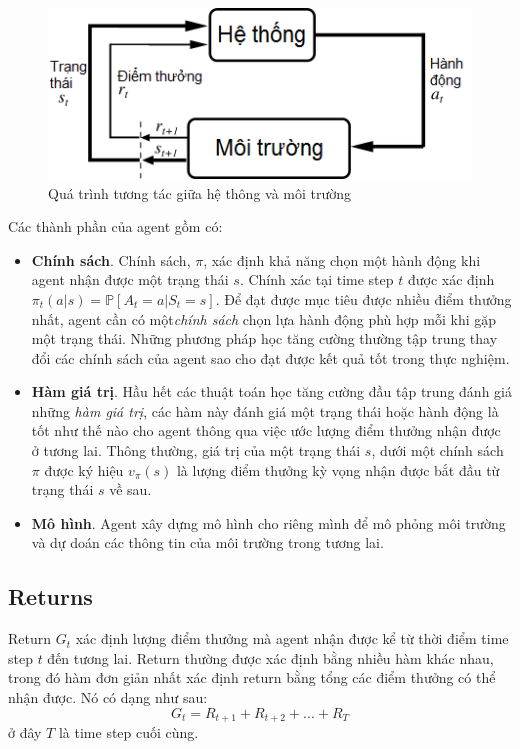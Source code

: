 	\begin{figure}
		\centering
		\includegraphics[width=\textwidth]{AgentEnvironment}
		\caption{Quá trình tương tác giữa hệ thông và môi trường}
		\label{AgentEnvironment}
	\end{figure}
	
	Các thành phần của agent gồm có:
	\begin{itemize}
		\item \textbf{Chính sách}. Chính sách, $\pi$, xác định khả năng chọn một hành động khi agent nhận được một trạng thái $s$. Chính xác tại time step $t$ được xác định $\pi_t(a|s) = \mathbb{P}[\mathit{A_t} = a|\mathit{S_t} = s]$. Để đạt được mục tiêu được nhiều điểm thưởng nhất, agent cần có một\textit{chính sách} chọn lựa hành động phù hợp mỗi khi gặp một trạng thái. Những phương pháp học tăng cường thường tập trung thay đổi các chính sách của agent sao cho đạt được kết quả tốt trong thực nghiệm.
		\item \textbf{Hàm giá trị}. Hầu hết các thuật toán học tăng cường đầu tập trung đánh giá những \textit{hàm giá trị}, các hàm này đánh giá một trạng thái hoặc hành động là tốt như thế nào cho agent thông qua việc ước lượng điểm thưởng nhận được ở tương lai. Thông thường, giá trị của một trạng thái $s$, dưới một chính sách $\pi$  được ký hiệu $v_{\pi}(s)$ là lượng điểm thưởng kỳ vọng nhận được bắt đầu từ trạng thái $s$ về sau.
		\item \textbf{Mô hình}. Agent xây dựng mô hình cho riêng mình để mô phỏng môi trường và dự doán các thông tin của môi trường trong tương lai.
	\end{itemize}	
	
	\subsection{Returns}
	Return $\mathit{G_t}$ xác định lượng điểm thưởng mà agent nhận được kể từ thời điểm time step $t$ đến tương lai. Return thường được xác định bằng nhiều hàm khác nhau, trong đó hàm đơn giản nhất xác định return bằng tổng các điểm thưởng có thể nhận được. Nó có dạng như sau:
	$$\mathit{G_t} = \mathit{R_{t+1}} + \mathit{R_{t+2}} + ... + \mathit{R_{T}}$$
	ở đây $T$ là time step cuối cùng.
	
